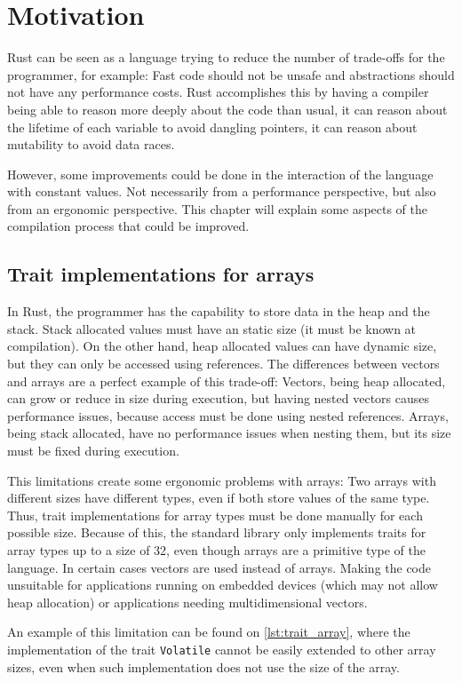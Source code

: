 \chapter{Motivation}
Rust can be seen as a language trying to reduce the number of trade-offs for the programmer, for example: Fast code should not be unsafe and abstractions should not have any performance costs. Rust accomplishes this by having a compiler being able to reason more deeply about the code than usual, it can reason about the lifetime of each variable to avoid dangling pointers, it can reason about mutability to avoid data races. 

However, some improvements could be done in the interaction of the language with constant values. Not necessarily from a performance perspective, but also from an ergonomic perspective. This chapter will explain some aspects of the compilation process that could be improved. 

\label{chapter:motivation}
\section{Trait implementations for arrays}
In Rust, the programmer has the capability to store data in the heap and the stack. Stack allocated values must have an static size (it must be known at compilation). On the other hand, heap allocated values can have dynamic size, but they can only be accessed using references. The differences between vectors and arrays are a perfect example of this trade-off: Vectors, being heap allocated, can grow or reduce in size during execution, but having nested vectors causes performance issues, because access must be done using nested references. Arrays, being stack allocated, have no performance issues when nesting them, but its size must be fixed during execution.

This limitations create some ergonomic problems with arrays: Two arrays with different sizes have different types, even if both store values of the same type. Thus, trait implementations for array types must be done manually for each possible size. Because of this, the standard library only implements traits for array types up to a size of 32, even though arrays are a primitive type of the language. In certain cases vectors are used instead of arrays. Making the code unsuitable for applications running on embedded devices (which may not allow heap allocation) or applications needing multidimensional vectors.

An example of this limitation can be found on \ref{lst:trait_array}, where the implementation of the trait \texttt{Volatile} cannot be easily extended to other array sizes, even when such implementation does not use the size of the array. 

